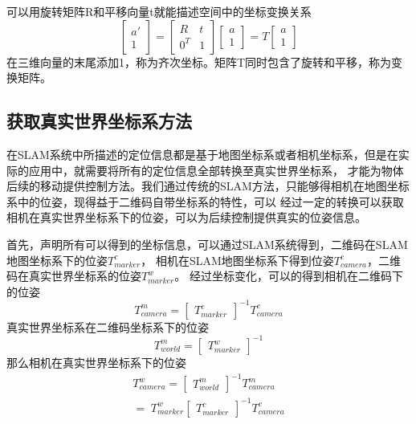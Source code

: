 可以用旋转矩阵R和平移向量t就能描述空间中的坐标变换关系
\begin{equation}
\begin{bmatrix}a'\\1\end{bmatrix}=
\begin{bmatrix}R&t\\0^T&1\end{bmatrix}
\begin{bmatrix}a\\1\end{bmatrix}=T
\begin{bmatrix}a\\1\end{bmatrix}
\end{equation}
在三维向量的末尾添加1，称为齐次坐标。矩阵T同时包含了旋转和平移，称为变换矩阵。
\subsection{获取真实世界坐标系方法}
\label{chap:chap2.4.1}
在SLAM系统中所描述的定位信息都是基于地图坐标系或者相机坐标系，但是在实际的应用中，就需要将所有的定位信息全部转换至真实世界坐标系，
才能为物体后续的移动提供控制方法。我们通过传统的SLAM方法，只能够得相机在地图坐标系中的位姿，现得益于二维码自带坐标系的特性，可以
经过一定的转换可以获取相机在真实世界坐标系下的位姿，可以为后续控制提供真实的位姿信息。

首先，声明所有可以得到的坐标信息，可以通过SLAM系统得到，二维码在SLAM地图坐标系下的位姿$T_{marker}^{c}$，
相机在SLAM地图坐标系下得到位姿$T_{camera}^{c}$，二维码在真实世界坐标系的位姿$T_{marker}^{w}$。
经过坐标变化，可以的得到相机在二维码下的位姿
\begin{equation}
T_{camera}^{m} =\begin{bmatrix}T_{marker}^{c}\end{bmatrix}^{-1}T_{camera}^{c}
\end{equation}
真实世界坐标系在二维码坐标系下的位姿
\begin{equation}
T_{world}^{m} =\begin{bmatrix}T_{marker}^{w}\end{bmatrix}^{-1}
\end{equation}
那么相机在真实世界坐标系下的位姿
\begin{equation}
\begin{array}{l}T_{camera}^w=
\begin{bmatrix}T_{world}^m\end{bmatrix}^{-1}T_{camera}^m\\=\;T_{marker}^w
\begin{bmatrix}T_{marker}^c\end{bmatrix}^{-1}T_{camera}^c\end{array}
\end{equation}

